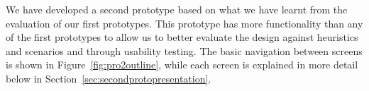 We have developed a second prototype based on what we have learnt from the
evaluation of our first prototypes. This prototype has more functionality than
any of the first prototypes to allow us to better evaluate the design against
heuristics and scenarios and through usability testing. The basic navigation
between screens is shown in Figure~\ref{fig:pro2outline}, while each screen is
explained in more detail below in Section~\ref{sec:secondprotopresentation}.
